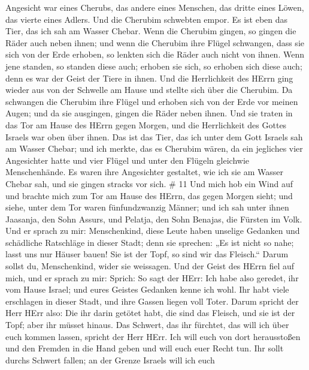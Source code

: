 Angesicht war eines Cherubs, das andere eines Menschen, das dritte eines
Löwen, das vierte eines Adlers.  Und die Cherubim schwebten
empor. Es ist eben das Tier, das ich sah am Wasser Chebar. 
Wenn die Cherubim gingen, so gingen die Räder auch neben ihnen; und wenn
die Cherubim ihre Flügel schwangen, dass sie sich von der Erde erhoben,
so lenkten sich die Räder auch nicht von ihnen.  Wenn jene
standen, so standen diese auch; erhoben sie sich, so erhoben sich diese
auch; denn es war der Geist der Tiere in ihnen.  Und die
Herrlichkeit des HErrn ging wieder aus von der Schwelle am Hause und
stellte sich über die Cherubim.  Da schwangen die Cherubim
ihre Flügel und erhoben sich von der Erde vor meinen Augen; und da sie
ausgingen, gingen die Räder neben ihnen. Und sie traten in das Tor am
Hause des HErrn gegen Morgen, und die Herrlichkeit des Gottes Israels
war oben über ihnen.  Das ist das Tier, das ich unter dem
Gott Israels sah am Wasser Chebar; und ich merkte, das es Cherubim
wären,  da ein jegliches vier Angesichter hatte und vier
Flügel und unter den Flügeln gleichwie Menschenhände.  Es
waren ihre Angesichter gestaltet, wie ich sie am Wasser Chebar sah, und
sie gingen stracks vor sich. \# 11  Und mich hob ein Wind
auf und brachte mich zum Tor am Hause des HErrn, das gegen Morgen sieht;
und siehe, unter dem Tor waren fünfundzwanzig Männer; und ich sah unter
ihnen Jaasanja, den Sohn Assurs, und Pelatja, den Sohn Benajas, die
Fürsten im Volk.  Und er sprach zu mir: Menschenkind, diese
Leute haben unselige Gedanken und schädliche Ratschläge in dieser Stadt;
 denn sie sprechen: „Es ist nicht so nahe; lasst uns nur
Häuser bauen! Sie ist der Topf, so sind wir das Fleisch.`` 
Darum sollst du, Menschenkind, wider sie weissagen.  Und der
Geist des HErrn fiel auf mich, und er sprach zu mir: Sprich: So sagt der
HErr: Ich habe also geredet, ihr vom Hause Israel; und eures Geistes
Gedanken kenne ich wohl.  Ihr habt viele erschlagen in
dieser Stadt, und ihre Gassen liegen voll Toter.  Darum
spricht der Herr HErr also: Die ihr darin getötet habt, die sind das
Fleisch, und sie ist der Topf; aber ihr müsset hinaus.  Das
Schwert, das ihr fürchtet, das will ich über euch kommen lassen, spricht
der Herr HErr.  Ich will euch von dort herausstoßen und den
Fremden in die Hand geben und will euch euer Recht tun. 
Ihr sollt durchs Schwert fallen; an der Grenze Israels will ich euch
